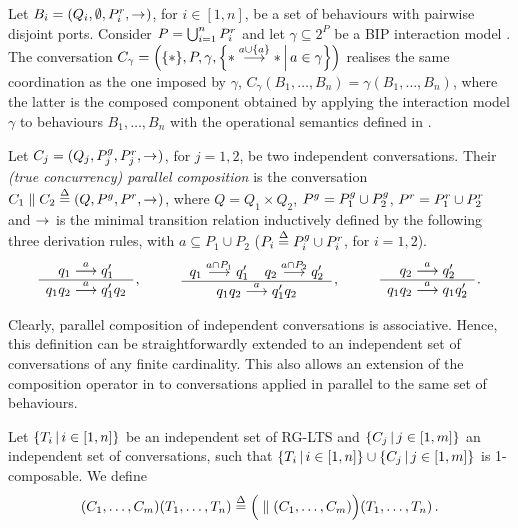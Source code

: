 \begin{example}
  \label{ex:bip}
  Let $B_i = (Q_i, \emptyset, \pout_i, \goesto)$, for $i \in [1,n]$, be a
  set of behaviours with pairwise disjoint ports.  Consider $P =
  \bigcup_{i=1}^n \pout_i$ and let $\gamma \subseteq 2^P$ be a BIP
  interaction model \cite{BliSif07-acp-emsoft}.  The conversation $C_\gamma
  = \Big(\{*\}, P, \gamma, \Setdef{* \longgoesto[a\cup\{a\}] *}{a \in
    \gamma}\Big)$ realises the same coordination as the one imposed by
  $\gamma$, \ie $C_\gamma(B_1, \dots, B_n) = \gamma(B_1, \dots, B_n)$,
  where the latter is the composed component obtained by applying the
  interaction model $\gamma$ to behaviours $B_1, \dots, B_n$ with the
  operational semantics defined in \cite{BliSif07-acp-emsoft}.
\end{example}

\begin{definition}
  \label{defn:composition:parallel}
  Let $C_j = (Q_j, \pin_j, \pout_j, \goesto)$, for $j = 1,2$, be two
  independent conversations.  Their \emph{(true concurrency) parallel
    composition} is the conversation $C_1 \parallel C_2 \bydef{=} (Q, \pin,
  \pout, \goesto)$, where $Q = Q_1 \times Q_2$, $\pin = \pin_1 \cup
  \pin_2$, $\pout = \pout_1 \cup \pout_2$ and $\goesto$ is the minimal
  transition relation inductively defined by the following three derivation
  rules, with $a \subseteq P_1 \cup P_2$ ($P_i \bydef{=} \pin_i \cup
  \pout_i$, for $i=1,2$).
  \begin{equation}
    \label{eq:parallel}
    \derrule{q_1 \longgoesto[a] q_1'}{q_1 q_2 \longgoesto[a] q_1' q_2}\,,
    \hspace{1cm}
    \derrule[2]{
      q_1 \longgoesto[a \cap P_1] q_1' & 
      q_2 \longgoesto[a \cap P_2] q_2' 
    }{
      q_1 q_2 \longgoesto[a] q_1' q_2
    }\,,
    \hspace{1cm}
    \derrule{q_2 \longgoesto[a] q_2'}{q_1 q_2 \longgoesto[a] q_1 q_2'}\,.
  \end{equation}
\end{definition}

Clearly, parallel composition of independent conversations is associative.
Hence, this definition can be straightforwardly extended to an independent
set of conversations of any finite cardinality.  This also allows an
extension of the composition operator in  to
conversations applied in parallel to the same set of behaviours.

\begin{definition}
  \label{defn:composition:multi}
  Let $\setdef{T_i}{i \in [1,n]}$ be an independent set of RG-LTS and
  $\setdef{C_j}{j \in [1,m]}$ an independent set of conversations, such
  that $\setdef{T_i}{i \in [1,n]} \cup \setdef{C_j}{j \in [1,m]}$ is
  1-composable.  We define
  \[
    (C_1, \dots, C_m)(T_1, \dots, T_n) 
    \bydef{=} 
    \Big(\parallel(C_1, \dots, C_m)\Big)(T_1, \dots, T_n)\,.
  \]
\end{definition}

